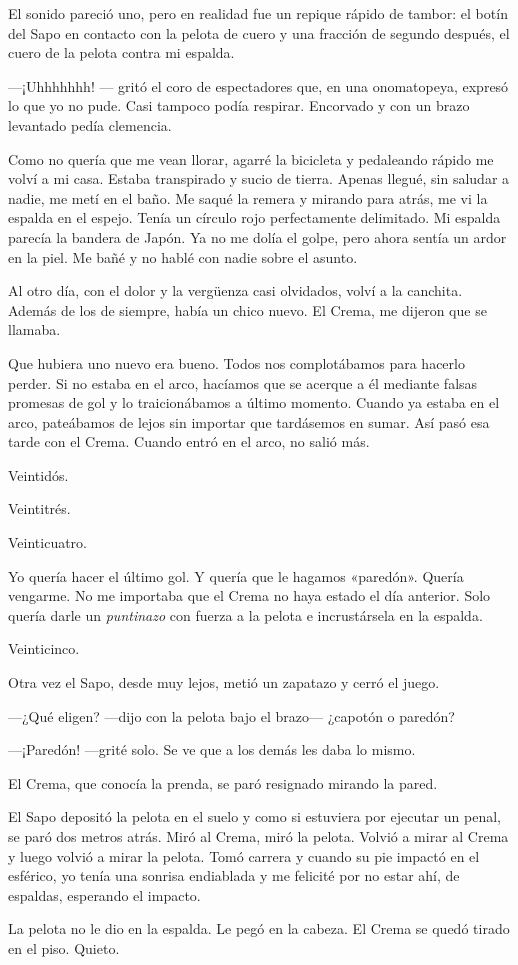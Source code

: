 \documentclass[11pt,twoside,openright]{book}
\begin{document}
 El sonido pareció uno, pero en realidad fue un repique rápido de tambor: el
 botín del Sapo en contacto con la pelota de cuero y una fracción de segundo
 después, el cuero de la pelota contra mi espalda.
 
 ---¡Uhhhhhhh! --- gritó el coro de espectadores que, en una onomatopeya,
 expresó lo que yo no pude. Casi tampoco podía respirar. Encorvado y con un
 brazo levantado pedía clemencia.
 
 Como no quería que me vean llorar, agarré la bicicleta y pedaleando rápido me
 volví a mi casa. Estaba transpirado y sucio de tierra. Apenas llegué, sin
 saludar a nadie, me metí en el baño. Me saqué la remera y mirando para atrás,
 me vi la espalda en el espejo. Tenía un círculo rojo perfectamente delimitado.
 Mi espalda parecía la bandera de Japón. Ya no me dolía el golpe, pero ahora
 sentía un ardor en la piel. Me bañé y no hablé con nadie sobre el asunto.
 
 Al otro día, con el dolor y la vergüenza casi olvidados, volví a la canchita.
 Además de los de siempre, había un chico nuevo.  El Crema, me dijeron que se
 llamaba.
 
 Que hubiera uno nuevo era bueno. Todos nos complotábamos para hacerlo perder.
 Si no estaba en el arco, hacíamos que se acerque a él mediante falsas promesas
 de gol y lo traicionábamos a último momento. Cuando ya estaba en el arco,
 pateábamos de lejos sin importar que tardásemos en sumar. Así pasó esa tarde
 con el Crema. Cuando entró en el arco, no salió más.
 
 Veintidós.
 
 Veintitrés.
 
 Veinticuatro.
 
 Yo quería hacer el último gol. Y quería que le hagamos «paredón». Quería
 vengarme. No me importaba que el Crema no haya estado el día anterior. Solo
 quería darle un \emph{puntinazo} con fuerza a la pelota e incrustársela en la
 espalda.
 
 Veinticinco.
 
 Otra vez el Sapo, desde muy lejos, metió un zapatazo y cerró el juego.
 
 ---¿Qué eligen? ---dijo con la pelota bajo el brazo--- ¿capotón o paredón?
 
 ---¡Paredón! ---grité solo. Se ve que a los demás les daba lo mismo.
 
 El Crema, que conocía la prenda, se paró resignado mirando la pared.
 
 El Sapo depositó la pelota en el suelo y como si estuviera por ejecutar un
 penal,  se paró dos metros atrás. Miró al Crema, miró la pelota. Volvió a mirar
 al Crema y luego volvió a mirar la pelota. Tomó carrera y cuando su pie impactó
 en el esférico, yo tenía una sonrisa endiablada y me felicité por no estar ahí,
 de espaldas, esperando el impacto.
 
 La pelota no le dio en la espalda. Le pegó en la cabeza. El Crema se quedó
 tirado en el piso. Quieto.


\cleardoublepage

%
\end{document}
